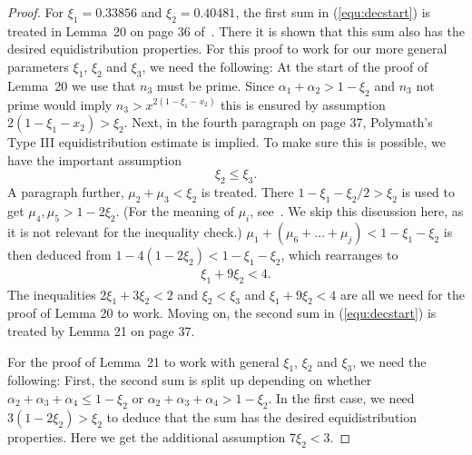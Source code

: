 \documentclass{amsart}
\numberwithin{equation}{section}
\begin{document}
\begin{proof}
\medskip For $\xi_1 =0.33856$ and $\xi_2=0.40481$, the first sum in  (\ref{equ:decstart}) is treated in Lemma~20 on page 36 of~\cite{Stadlmann:2023:PAP}. There it is shown that this sum also has the desired equidistribution properties. For this proof to work for our more general parameters $\xi_1$, $\xi_2$ and $\xi_3$, we need the following: At the start of the proof of Lemma~20 we use that $n_3$ must be prime. Since $\alpha_1+\alpha_2 > 1-\xi_2$ and $n_3$ not prime would imply $n_3 > x^{2(1-\xi_1-x_2)}$  this is ensured by assumption $2(1-\xi_1-x_2)  >\xi_2$. Next, in the fourth paragraph on page 37, Polymath's Type III equidistribution estimate is implied. To make sure this is possible, we have the important assumption
$$  \xi_2 \leq \xi_3.$$ 
A paragraph further,  $\mu_2 + \mu_3 < \xi_2$ is treated. There $1-\xi_1-\xi_2/2 > \xi_2$ is used to get $\mu_4, \mu_5>1-2\xi_2$. (For the meaning of $\mu_i$, see~\cite{Stadlmann:2023:PAP}. We skip this discussion here, as it is not relevant for the inequality check.) $\mu_1 + (\mu_6 + \dots + \mu_j)<1-\xi_1-\xi_2$ is then deduced from  $1-4(1-2\xi_2) < 1-\xi_1-\xi_2$, which rearranges to
\begin{align*}
\xi_1+ 9\xi_2 < 4.
\end{align*}
The inequalities $2\xi_1 + 3\xi_2 <2$ and  $\xi_2 < \xi_3$ and $\xi_1+9\xi_2 <4$ are all we need for the proof of Lemma 20 to work.  Moving on, the second sum in (\ref{equ:decstart}) is treated by Lemma 21 on page 37. 

\medskip For the proof of Lemma~21 to work with general $\xi_1$, $\xi_2$ and $\xi_3$, we need the following: First, the second sum is split up depending on whether $\alpha_2+\alpha_3+\alpha_4 \leq 1-\xi_2$ or $\alpha_2+\alpha_3+\alpha_4 > 1-\xi_2$. In the first case, we   need $3 (1-2\xi_2) > \xi_2$ to deduce that the sum has the desired equidistribution properties. Here we get the additional assumption
$ 7 \xi_2 < 3.$ 


\end{proof}
\end{document}
